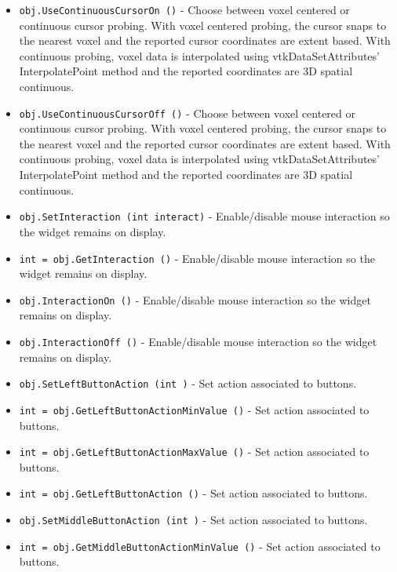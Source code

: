 \begin{itemize}
\item  \verb|obj.UseContinuousCursorOn ()| -  Choose between voxel centered or continuous cursor probing.  With voxel
 centered probing, the cursor snaps to the nearest voxel and the reported
 cursor coordinates are extent based.  With continuous probing, voxel data
 is interpolated using vtkDataSetAttributes' InterpolatePoint method and
 the reported coordinates are 3D spatial continuous.

\item  \verb|obj.UseContinuousCursorOff ()| -  Choose between voxel centered or continuous cursor probing.  With voxel
 centered probing, the cursor snaps to the nearest voxel and the reported
 cursor coordinates are extent based.  With continuous probing, voxel data
 is interpolated using vtkDataSetAttributes' InterpolatePoint method and
 the reported coordinates are 3D spatial continuous.

\item  \verb|obj.SetInteraction (int interact)| -  Enable/disable mouse interaction so the widget remains on display.

\item  \verb|int = obj.GetInteraction ()| -  Enable/disable mouse interaction so the widget remains on display.

\item  \verb|obj.InteractionOn ()| -  Enable/disable mouse interaction so the widget remains on display.

\item  \verb|obj.InteractionOff ()| -  Enable/disable mouse interaction so the widget remains on display.

\item  \verb|obj.SetLeftButtonAction (int )| -  Set action associated to buttons.

\item  \verb|int = obj.GetLeftButtonActionMinValue ()| -  Set action associated to buttons.

\item  \verb|int = obj.GetLeftButtonActionMaxValue ()| -  Set action associated to buttons.

\item  \verb|int = obj.GetLeftButtonAction ()| -  Set action associated to buttons.

\item  \verb|obj.SetMiddleButtonAction (int )| -  Set action associated to buttons.

\item  \verb|int = obj.GetMiddleButtonActionMinValue ()| -  Set action associated to buttons.


\end{itemize}
